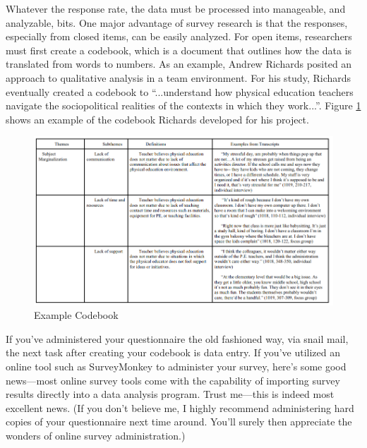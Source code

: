 Whatever the response rate, the data must be processed into manageable, and analyzable, bits. One major advantage of survey research is that the responses, especially from closed items, can be easily analyzed. For open items, researchers must first create a codebook, which is a document that outlines how the data is translated from words to numbers. As an example, Andrew Richards posited an approach to qualitative analysis in a team environment\cite{richards2018practical}. For his study, Richards eventually created a codebook to ``...understand how physical education teachers navigate the sociopolitical
realities of the contexts in which they work...''. Figure \ref{fig08.02} shows an example of the codebook Richards developed for his project.

\begin{figure}[H]
	\centering
	\includegraphics[width=\maxwidth{.95\linewidth}]{gfx/08-codebook}
	\caption{Example Codebook}
	\label{fig08.02}
\end{figure}

If you’ve administered your questionnaire the old fashioned way, via snail mail, the next task after creating your codebook is data entry. If you’ve utilized an online tool such as SurveyMonkey to administer your survey, here’s some good news—most online survey tools come with the capability of importing survey results directly into a data analysis program. Trust me—this is indeed most excellent news. (If you don’t believe me, I highly recommend administering hard copies of your questionnaire next time around. You’ll surely then appreciate the wonders of online survey administration.)

